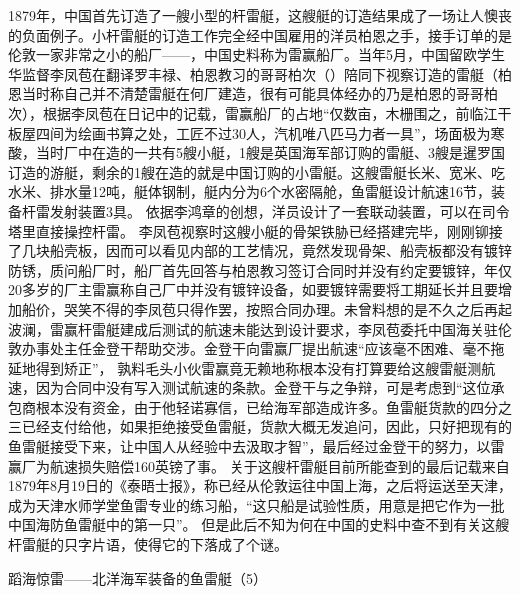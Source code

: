 \documentclass[12pt,UTF8]{ctexbook}
\begin{document}
1879年，中国首先订造了一艘小型的杆雷艇，这艘艇的订造结果成了一场让人懊丧的负面例子。小杆雷艇的订造工作完全经中国雇用的洋员柏恩之手，接手订单的是伦敦一家非常之小的船厂——，中国史料称为雷赢船厂。当年5月，中国留欧学生华监督李凤苞在翻译罗丰禄、柏恩教习的哥哥柏次（）陪同下视察订造的雷艇（柏恩当时称自己并不清楚雷艇在何厂建造，很有可能具体经办的乃是柏恩的哥哥柏次），根据李凤苞在日记中的记载，雷赢船厂的占地“仅数亩，木栅围之，前临江干板屋四间为绘画书算之处，工匠不过30人，汽机唯八匹马力者一具”，场面极为寒酸，当时厂中在造的一共有5艘小艇，1艘是英国海军部订购的雷艇、3艘是暹罗国订造的游艇，剩余的1艘在造的就是中国订购的小雷艇。这艘雷艇长米、宽米、吃水米、排水量12吨，艇体钢制，艇内分为6个水密隔舱，鱼雷艇设计航速16节，装备杆雷发射装置3具。 依据李鸿章的创想，洋员设计了一套联动装置，可以在司令塔里直接操控杆雷。 李凤苞视察时这艘小艇的骨架铁胁已经搭建完毕，刚刚铆接了几块船壳板，因而可以看见内部的工艺情况，竟然发现骨架、船壳板都没有镀锌防锈，质问船厂时，船厂首先回答与柏恩教习签订合同时并没有约定要镀锌，年仅20多岁的厂主雷赢称自己厂中并没有镀锌设备，如要镀锌需要将工期延长并且要增加船价，哭笑不得的李凤苞只得作罢，按照合同办理。未曾料想的是不久之后再起波澜，雷赢杆雷艇建成后测试的航速未能达到设计要求，李凤苞委托中国海关驻伦敦办事处主任金登干帮助交涉。金登干向雷赢厂提出航速“应该毫不困难、毫不拖延地得到矫正”， 孰料毛头小伙雷赢竟无赖地称根本没有打算要给这艘雷艇测航速，因为合同中没有写入测试航速的条款。金登干与之争辩，可是考虑到“这位承包商根本没有资金，由于他轻诺寡信，已给海军部造成许多。鱼雷艇货款的四分之三已经支付给他，如果拒绝接受鱼雷艇，货款大概无发追问，因此，只好把现有的鱼雷艇接受下来，让中国人从经验中去汲取才智”，最后经过金登干的努力，以雷赢厂为航速损失赔偿160英镑了事。 关于这艘杆雷艇目前所能查到的最后记载来自1879年8月19日的《泰晤士报》，称已经从伦敦运往中国上海，之后将运送至天津，成为天津水师学堂鱼雷专业的练习船，“这只船是试验性质，用意是把它作为一批中国海防鱼雷艇中的第一只”。 但是此后不知为何在中国的史料中查不到有关这艘杆雷艇的只字片语，使得它的下落成了个谜。




蹈海惊雷——北洋海军装备的鱼雷艇（5）
\end{document}

